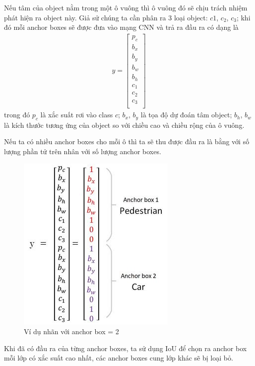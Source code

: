 Nếu tâm của object nằm trong một ô vuông thì ô vuông đó sẽ chịu trách nhiệm phát hiện ra object này. Giả sử chúng ta cần phân ra 3 loại object: $c1$, $c_2$, $c_3$; khi đó mỗi anchor boxes sẽ được đưa vào mạng CNN và trả ra đầu ra có dạng là
\begin{align*}
y = 
\begin{bmatrix}
p_c\\
b_x\\
b_y\\
b_w\\
b_h\\
c_1\\
c_2\\
c_3\\
\end{bmatrix}
\end{align*}
trong đó $p_c$ là xắc suất rơi vào class $c$; $b_x$, $b_y$ là tọa độ dự đoán tâm object; $b_h$, $b_w$ là kích thước tương ứng của object so với chiều cao và chiều rộng của ô vuông.\par
Nếu ta có nhiều anchor boxes cho mỗi ô thì ta sẽ thu được đầu ra là bằng với số lượng phần tử trên nhân với số lượng anchor boxes.
\begin{figure}[H]
\begin{center}
\includegraphics[scale=0.6]{chap4/image/labelyolo.jpg}
\caption{Ví dụ nhãn với anchor box = 2}
\end{center}
\end{figure}
Khi đã có đầu ra của từng anchor boxes, ta sử dụng IoU để chọn ra anchor box mỗi lớp có xắc suất cao nhất, các anchor boxes cung lớp khác sẽ bị loại bỏ.